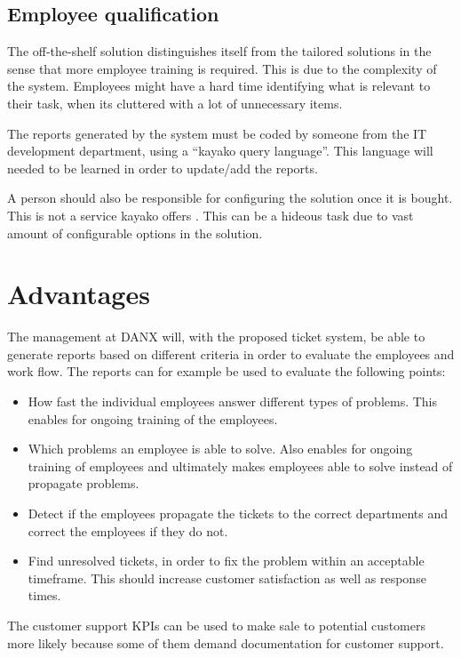 \subsection{Employee qualification}
The off-the-shelf solution distinguishes itself from the tailored solutions in the sense that more employee training is required. This is due to the complexity of the system.
Employees might have a hard time identifying what is relevant to their task, when its cluttered with a lot of unnecessary items. \cite{webpage007}

The reports generated by the system must be coded by someone from the IT development department, using a “kayako query language”. This language will needed to be learned in order to update/add the reports. 

A person should also be responsible for configuring the solution once it is bought. This is not a service kayako offers \cite{webpage008}. This can be a hideous task due to vast amount of configurable options in the solution.

\section{Advantages}
The management at DANX will, with the proposed ticket system, be able to generate reports based on different criteria in order to evaluate the employees and work flow. The reports can for example be used to evaluate the following points:
\begin{itemize}
	\item How fast the individual employees answer different types of problems. This enables for ongoing training of the employees.
	\item Which problems an employee is able to solve. Also enables for ongoing training of employees and ultimately makes employees able to solve instead of propagate problems.
\item Detect if the employees propagate the tickets to the correct departments and correct the employees if they do not.
\item Find unresolved tickets, in order to fix the problem within an acceptable timeframe. This should increase customer satisfaction as well as response times.
\end{itemize}
The customer support KPIs can be used to make sale to potential customers more likely because some of them demand documentation for customer support.\cite{bob01}

